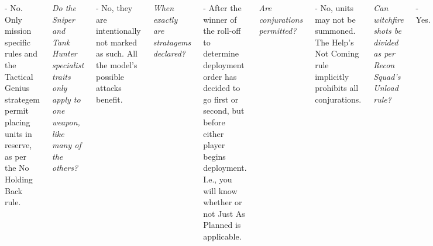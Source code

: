 \documentclass{40k}
\begin{document}
\begin{columns}
- No.  Only mission specific rules and the Tactical Genius strategem
permit placing units in reserve, as per the No Holding Back rule.

\smallskip\noindent\emph{Do the Sniper and Tank Hunter specialist
  traits only apply to one weapon, like many of the others?}

- No, they are intentionally not marked as such.  All the model's
possible attacks benefit.

\smallskip\noindent\emph{When exactly are stratagems declared?}

- After the winner of the roll-off to determine deployment order has
decided to go first or second, but before either player begins
deployment.  I.e., you will know whether or not Just As Planned is
applicable.

%

\smallskip\noindent\emph{Are conjurations permitted?}

- No, units may not be summoned.  The Help's Not Coming rule
implicitly prohibits all conjurations.

\smallskip\noindent\emph{Can witchfire shots be divided as per Recon Squad's Unload rule?}

- Yes.









\end{columns}
\end{document}

